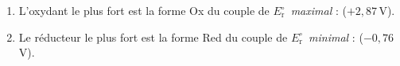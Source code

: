 \documentclass[11pt,a4paper]{article}
\newcommand{\Ered}{\ensuremath{E_{\mathrm{r}}^{\circ}}}
\begin{document}
\begin{corr}
\begin{enumerate}[label=(\alph*),leftmargin=2em,topsep=1pt,itemsep=1.5pt]
  \item L'oxydant le plus fort est la forme Ox du couple de \Ered\ \emph{maximal} : \textbf{} ($+2{,}87$\,V).
  \item Le réducteur le plus fort est la forme Red du couple de \Ered\ \emph{minimal} : \textbf{} ($-0{,}76$\,V).
\end{enumerate}
\end{corr}
\end{document}
